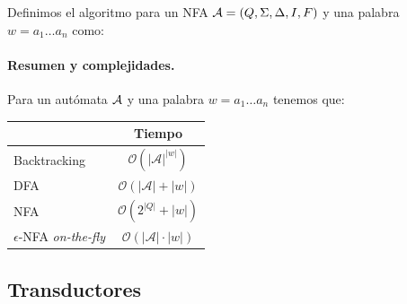 Definimos el algoritmo para un NFA $\mathcal{A}=(Q,\Sigma,\Delta,I,F)$ y una palabra $w = a_1 \ldots a_n$ como:
\vspace{-8pt}
\begin{algorithm}[hbt!]
    \DontPrintSemicolon
\end{algorithm}

\paragraph{Resumen y complejidades.} Para un autómata $\mathcal{A}$ y una palabra $w = a_1 \ldots a_n$ tenemos que:

\begin{table}[H]
    \centering
    \begin{tabular}{lc}
                                           & Tiempo                                        \\
        \hline
        Backtracking                       & $\mathcal{O}\left(|\mathcal{A}|^{|w|}\right)$ \\
        DFA                                & $\mathcal{O}(|\mathcal{A}|+|w|)$              \\
        NFA                                & $\mathcal{O}\left(2^{|Q|}+|w|\right)$         \\
        $\epsilon$-NFA \textit{on-the-fly} & $\mathcal{O}(|\mathcal{A}| \cdot|w|)$
    \end{tabular}
\end{table}


\subsection{Transductores}

